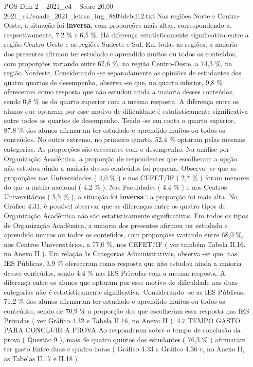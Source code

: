 \begin{textsample}{POS Dim 2 – 2021\_c4 – Score 20.00 – 2021\_c4/enade\_2021\_letras\_ing\_8809dcbd12.txt}
Nas regiões Norte e Centro-Oeste, a situação foi \textbf{inversa}, com proporções mais altas, correspondendo a, respectivamente, 7,2 \% e 6,5 \%.
Há diferença estatisticamente significativa entre a região Centro-Oeste e as regiões Sudeste e Sul.
Em todas as regiões, a maioria dos presentes afirmou ter estudado e aprendido muitos ou todos os conteúdos, com proporções variando entre 62,6 \%, na região Centro-Oeste, a 74,3 \%, na região Nordeste.
Considerando -se separadamente as opiniões de estudantes dos quatro quartos de desempenho, observa -se que, no quarto inferior, 9,8 \% ofereceram como resposta que não estudou ainda a maioria desses conteúdos, sendo 0,8 \% os do quarto superior com a mesma resposta.
A diferença entre os alunos que optaram por esse motivo de dificuldade é estatisticamente significativa entre todos os quartos de desempenho.
Tendo -se em conta o quarto superior, 87,8 \% dos alunos afirmaram ter estudado e aprendido muitos ou todos os conteúdos.
No outro extremo, no primeiro quarto, 52,4 \% optaram pelas mesmas categorias.
As proporções são crescentes com o desempenho.
Na análise por Organização Acadêmica, a proporção de respondentes que escolheram a opção não estudou ainda a maioria desses conteúdos foi pequena.
Observa -se que as proporções nas Universidades ( 4,0 \% ) e nos CEFET/IF ( 2,7 \% ) foram menores do que a média nacional ( 4,2 \% ).
Nas Faculdades ( 4,4 \% ) e nos Centros Universitários ( 5,5 \% ), a situação foi \textbf{inversa} : a proporção foi mais alta.
No Gráfico 4.31, é possível observar que as diferenças entre os quatro tipos de Organização Acadêmica não são estatisticamente significativas.
Em todos os tipos de Organização Acadêmica, a maioria dos presentes afirmou ter estudado e aprendido muitos ou todos os conteúdos, com proporções variando entre 68,0 \%, nos Centros Universitários, a 77,0 \%, nos CEFET/IF ( ver também Tabela II.16, no Anexo II ).
Em relação às Categorias Administrativas, observa -se que, nas IES Públicas, 3,9 \% ofereceram como resposta que não estudou ainda a maioria desses conteúdos, sendo 4,4 \% nas IES Privadas com a mesma resposta.
A diferença entre os alunos que optaram por esse motivo de dificuldade nas duas categorias não é estatisticamente significativa.
Considerando -se as IES Públicas, 71,2 \% dos alunos afirmaram ter estudado e aprendido muitos ou todos os conteúdos, sendo de 70,9 \% a proporção dos que escolheram essa resposta nas IES Privadas ( ver Gráfico 4.32 e Tabela II.16, no Anexo II ). 4.7 TEMPO GASTO PARA CONCLUIR A PROVA Ao responderem sobre o tempo de conclusão da prova ( Questão 9 ), mais de quatro quintos dos estudantes ( 76,3 \% ) afirmaram ter gasto Entre duas e quatro horas ( Gráfico 4.33 a Gráfico 4.36 e, no Anexo II, as Tabelas II.17 e II.18 ).

\end{textsample}
